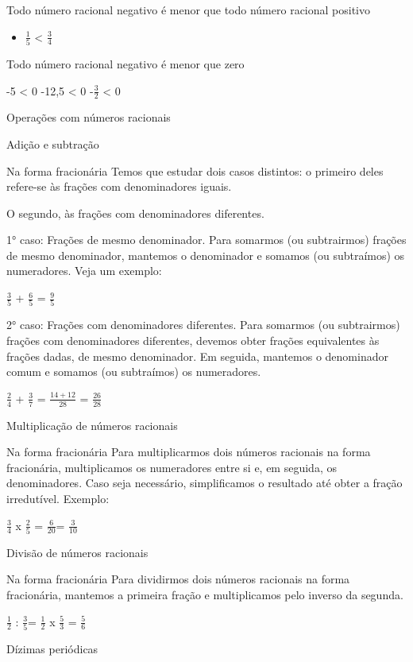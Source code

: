 {Todo número racional negativo é menor que todo número racional positivo

\begin{itemize}
\tightlist
\item
  \(\frac{1}{5}\) \textless{} \(\frac{3}{4}\)
\end{itemize}

Todo número racional negativo é menor que zero

-5 \textless{} 0 -12,5 \textless{} 0 -\(\frac{3}{2}\) \textless{} 0

Operações com números racionais

Adição e subtração

Na forma fracionária Temos que estudar dois casos distintos: o primeiro
deles refere-se às frações com denominadores iguais.

O segundo, às frações com denominadores diferentes.

1° caso: Frações de mesmo denominador. Para somarmos (ou subtrairmos)
frações de mesmo denominador, mantemos o denominador e somamos (ou
subtraímos) os numeradores. Veja um exemplo:

\(\frac{3}{5}\) + \(\frac{6}{5}\) = \(\frac{9}{5}\)

2° caso: Frações com denominadores diferentes. Para somarmos (ou
subtrairmos) frações com denominadores diferentes, devemos obter frações
equivalentes às frações dadas, de mesmo denominador. Em seguida,
mantemos o denominador comum e somamos (ou subtraímos) os numeradores.

\(\frac{2}{4}\) + \(\frac{3}{7}\) = \(\frac{14 + 12}{28}\) =
\(\frac{26}{28}\)

Multiplicação de números racionais

Na forma fracionária Para multiplicarmos dois números racionais na forma
fracionária, multiplicamos os numeradores entre si e, em seguida, os
denominadores. Caso seja necessário, simplificamos o resultado até obter
a fração irredutível. Exemplo:

\(\frac{3}{4}\) x \(\frac{2}{5}\) = \(\frac{6}{20}\)= \(\frac{3}{10}\)

Divisão de números racionais

Na forma fracionária Para dividirmos dois números racionais na forma
fracionária, mantemos a primeira fração e multiplicamos pelo inverso da
segunda.

\(\frac{1}{2}\) : \(\frac{3}{5}\)= \(\frac{1}{2}\) x \(\frac{5}{3}\) =
\(\frac{5}{6}\)

Dízimas periódicas

}
